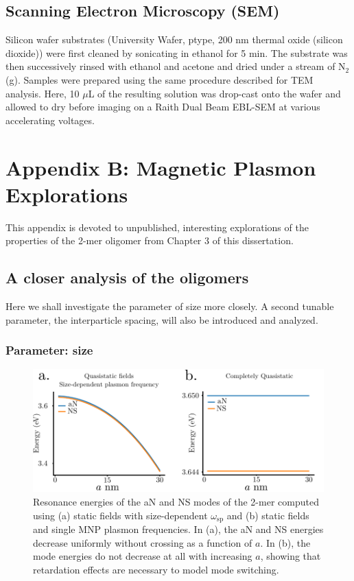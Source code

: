 \documentclass [11pt, proquest] {uwthesis}[2016/11/22]
\begin{document}
\section{Scanning Electron Microscopy (SEM)}

Silicon wafer substrates (University Wafer, ptype, 200 nm thermal oxide (silicon dioxide)) were first cleaned by sonicating in ethanol for 5 min. The substrate was then successively rinsed with ethanol and acetone and dried under a stream of N$_2$(g). Samples were prepared using the same procedure described for TEM analysis. Here, 10 $\mu$L of the resulting solution was drop-cast onto the wafer and allowed to dry before imaging on a Raith Dual Beam EBL-SEM at various accelerating voltages.


\chapter{Appendix B: Magnetic Plasmon Explorations}

This appendix is devoted to unpublished, interesting explorations of the properties of the 2-mer oligomer from Chapter 3 of this dissertation.

\section{A closer analysis of the oligomers}

Here we shall investigate the parameter of size more closely. A second tunable parameter, the interparticle spacing, will also be introduced and analyzed.

\subsection{Parameter: size}

\begin{figure}
\begin{centering}
\includegraphics{qs_limit.pdf}
\caption{Resonance energies of the aN and NS modes of the 2-mer computed using (a) static fields with size-dependent $\omega_{\textrm{sp}}$ and (b) static fields and single MNP plasmon frequencies. In (a), the aN and NS energies decrease uniformly without crossing as a function of $a$. In (b), the mode energies do not decrease at all with increasing $a$, showing that retardation effects are necessary to model mode switching.}
\label{qs_limit}
\end{centering}
\end{figure}
\end{document}
